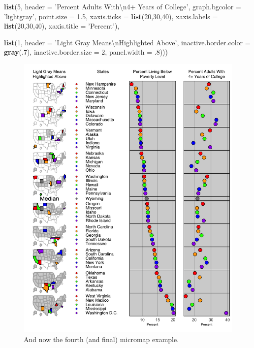 \documentclass[
]{krantz}
\makeatletter
\newenvironment{Shaded}{\begin{snugshade}}{\end{snugshade}}
\newcommand{\CharTok}[1]{\textcolor[rgb]{0.5,0.5,0.5}{#1}}
\newcommand{\DataTypeTok}[1]{\textcolor[rgb]{0.27,0.27,0.27}{#1}}
\newcommand{\DecValTok}[1]{\textcolor[rgb]{0.06,0.06,0.06}{#1}}
\newcommand{\FloatTok}[1]{\textcolor[rgb]{0.06,0.06,0.06}{#1}}
\newcommand{\KeywordTok}[1]{\textcolor[rgb]{0.27,0.27,0.27}{\textbf{#1}}}
\newcommand{\NormalTok}[1]{#1}
\newcommand{\StringTok}[1]{\textcolor[rgb]{0.5,0.5,0.5}{#1}}
\newenvironment{kframe}{%
\medskip{}
\setlength{\fboxsep}{.8em}
 \def\at@end@of@kframe{}%
 \ifinner\ifhmode%
  \def\at@end@of@kframe{\end{minipage}}%
  \begin{minipage}{\columnwidth}%
 \fi\fi%
 \def\FrameCommand##1{\hskip\@totalleftmargin \hskip-\fboxsep
 \colorbox{shadecolor}{##1}\hskip-\fboxsep
     \hskip-\linewidth \hskip-\@totalleftmargin \hskip\columnwidth}%
 \MakeFramed {\advance\hsize-\width
   \@totalleftmargin\z@ \linewidth\hsize
   \@setminipage}}%
 {\par\unskip\endMakeFramed%
 \at@end@of@kframe}
\renewenvironment{Shaded}{\begin{kframe}}{\end{kframe}}
\makeatother
\begin{document}
\begin{Shaded}
\begin{Highlighting}[]
            \KeywordTok{list}\NormalTok{(}\DecValTok{5}\NormalTok{, }\DataTypeTok{header =} \StringTok{'Percent Adults With}\CharTok{\textbackslash{}n}\StringTok{4+ Years of College'}\NormalTok{,}
                \DataTypeTok{graph.bgcolor =} \StringTok{'lightgray'}\NormalTok{, }\DataTypeTok{point.size =} \FloatTok{1.5}\NormalTok{,}
                \DataTypeTok{xaxis.ticks =} \KeywordTok{list}\NormalTok{(}\DecValTok{20}\NormalTok{,}\DecValTok{30}\NormalTok{,}\DecValTok{40}\NormalTok{), }
                \DataTypeTok{xaxis.labels =} \KeywordTok{list}\NormalTok{(}\DecValTok{20}\NormalTok{,}\DecValTok{30}\NormalTok{,}\DecValTok{40}\NormalTok{), }
                \DataTypeTok{xaxis.title =} \StringTok{'Percent'}\NormalTok{),}
    
            \KeywordTok{list}\NormalTok{(}\DecValTok{1}\NormalTok{, }\DataTypeTok{header =} \StringTok{'Light Gray Means}\CharTok{\textbackslash{}n}\StringTok{Highlighted Above'}\NormalTok{, }
                \DataTypeTok{inactive.border.color =} \KeywordTok{gray}\NormalTok{(.}\DecValTok{7}\NormalTok{), }\DataTypeTok{inactive.border.size =} \DecValTok{2}\NormalTok{, }
                \DataTypeTok{panel.width =} \FloatTok{.8}\NormalTok{)))}
\end{Highlighting}
\end{Shaded}

\begin{figure}
\includegraphics[width=0.9\linewidth]{JSmicromap4} \caption{And now the fourth (and final) micromap example.}\label{fig:micromap5}
\end{figure}
\end{document}
